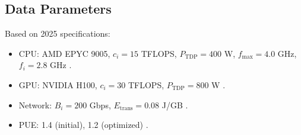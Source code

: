 \documentclass[a4paper,11pt]{article}
\begin{document}
\subsection{Data Parameters}
Based on 2025 specifications:
\begin{itemize}
    \item CPU: AMD EPYC 9005, $c_i = 15$ TFLOPS, $P_{\text{TDP}} = 400$ W, $f_{\text{max}} = 4.0$ GHz, $f_i = 2.8$ GHz \cite{AMD2025}.
    \item GPU: NVIDIA H100, $c_i = 30$ TFLOPS, $P_{\text{TDP}} = 800$ W \cite{NVIDIA2025}.
    \item Network: $B_i = 200$ Gbps, $E_{\text{trans}} = 0.08$ J/GB \cite{CERNNetwork2025}.
    \item PUE: 1.4 (initial), 1.2 (optimized) \cite{CERNDataCenter2025}.
\end{itemize}
\end{document}
